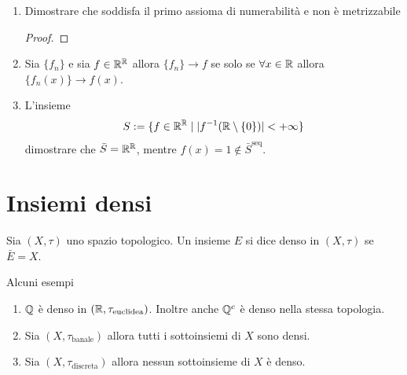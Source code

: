 \begin{remark}
\begin{enumerate}
\begin{proof}
		per cui, si, genera una e una sola topologia.
		\end{proof}
		\item Dimostrare che soddisfa il primo assioma di numerabilità e non è metrizzabile
		\begin{proof}
		\end{proof}
		\item Sia $\{f_n\}$ e sia $f \in \mathbb{R}^{\mathbb{R}}$ allora $\{f_n\} \rightarrow f$ se solo se $\forall x \in \mathbb{R}$ allora $\{f_n(x)\} \rightarrow f(x)$.
		\item L'insieme 
		\begin{equation}
		\begin{aligned}	
			S := \{ f \in \mathbb{R}^{\mathbb{R}} \; | \; |f^{-1}(\mathbb{R} \setminus \{0\})| < +\infty \}
		\end{aligned}
		\end{equation}
		dimostrare che $\bar{S} = \mathbb{R}^{\mathbb{R}}$, mentre $f(x)= 1 \notin \bar{S}^\text{seq}$.
	\end{enumerate}
	\end{remark}

\section{Insiemi densi}

\begin{definition}
	Sia $(X,\tau)$ uno spazio topologico. Un insieme $E$ si dice denso in $(X, \tau)$ se $\bar{E} = X$. 
\end{definition}

Alcuni esempi
\begin{enumerate}
	\item $\mathbb{Q}$ è denso in $(\mathbb{R}, \tau_{\text{euclidea}})$. Inoltre anche $\mathbb{Q}^c$ è denso nella stessa topologia.
	\item Sia $(X,\tau_{\text{banale}})$ allora tutti i sottoinsiemi di $X$ sono densi.
	\item Sia $(X,\tau_{\text{discreta}})$ allora nessun sottoinsieme di $X$ è denso.
\end{enumerate}

